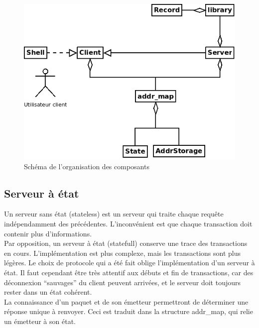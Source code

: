 \documentclass[10pt,a4paper]{article}
\begin{document}
\begin{figure}[H]
 \centering
 \includegraphics[width=12cm]{Diagramme1}
 \caption{Schéma de l'organisation des composants}
\end{figure}

\newpage
\subsection{Serveur à état} \label{sec:etat}
Un serveur sans état (stateless) est un serveur qui traite chaque requête indépendamment des précédentes. L'inconvénient est que chaque transaction doit contenir plus d'informations.\\
Par opposition, un serveur à état (statefull) conserve une trace des transactions en cours. L'implémentation est plus complexe, mais les transactions sont plus légères. Le choix de protocole qui a été fait oblige l'implémentation d'un serveur à état.
Il faut cependant être très attentif aux débuts et fin de transactions, car des déconnexion ``sauvages'' du client peuvent arrivées, et le serveur doit toujours rester dans un état cohérent.\\

La connaissance d'un paquet et de son émetteur permettront de déterminer une réponse unique à renvoyer. Ceci est traduit dans la structure addr\_map, qui relie un émetteur à son état.
\end{document}
